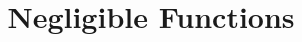 \documentclass{article}
\title{Negligible Functions}
\begin{document}
\maketitle

\begin{definition}[Negligible]
\end{definition}
\end{document}
